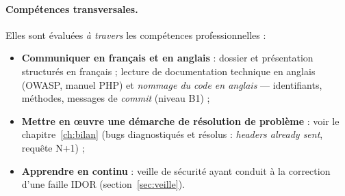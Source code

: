 \paragraph{Compétences transversales.} Elles sont évaluées \emph{à travers} les compétences
professionnelles :
\begin{itemize}
  \item \textbf{Communiquer en français et en anglais} : dossier et présentation structurés en
        français ; lecture de documentation technique en anglais (OWASP, manuel PHP) et
        \emph{nommage du code en anglais} — identifiants, méthodes, messages de \emph{commit}
        (niveau B1) ;
  \item \textbf{Mettre en œuvre une démarche de résolution de problème} : voir le
        chapitre~\ref{ch:bilan} (bugs diagnostiqués et résolus : \emph{headers already sent},
        requête N+1) ;
  \item \textbf{Apprendre en continu} : veille de sécurité ayant conduit à la correction
        d'une faille IDOR (section~\ref{sec:veille}).
\end{itemize}

